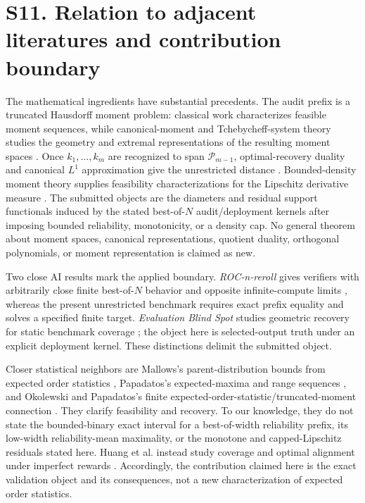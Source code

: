 \documentclass[10pt,twocolumn]{article}
\begin{document}
\section*{S11. Relation to adjacent literatures and contribution boundary}

The mathematical ingredients have substantial precedents. The audit prefix is
a truncated Hausdorff moment problem: classical work characterizes feasible
moment sequences, while canonical-moment and Tchebycheff-system theory studies
the geometry and extremal representations of the resulting moment spaces
\citep{hausdorff1921,dette1997}. Once $k_1,\ldots,k_m$ are recognized to span
$\mathcal P_{m-1}$, optimal-recovery duality and canonical $L^1$
approximation give the unrestricted distance \citep{donoho1994,bojanov1986}.
Bounded-density moment theory supplies feasibility characterizations for the
Lipschitz derivative measure \citep{lasserre2006}. The submitted objects are
the diameters and residual support functionals induced by the stated
best-of-$N$ audit/deployment kernels after imposing bounded reliability,
monotonicity, or a density cap. No general theorem about moment spaces,
canonical representations, quotient duality, orthogonal polynomials, or
moment representation is claimed as new.

Two close AI results mark the applied boundary. \emph{ROC-n-reroll} gives
verifiers with arbitrarily close finite best-of-$N$ behavior and opposite
infinite-compute limits \citep{dorner2026}, whereas the present unrestricted
benchmark requires exact prefix equality and solves a specified finite target.
\emph{Evaluation Blind Spot} studies geometric recovery for static benchmark
coverage \citep{wang2026}; the object here is selected-output truth under an
explicit deployment kernel. These distinctions delimit the submitted object.

Closer statistical neighbors are Mallows's parent-distribution bounds from
expected order statistics \citep{mallows1973}, Papadatos's expected-maxima and
range sequences \citep{papadatos2017}, and Okolewski and Papadatos's finite
expected-order-statistic/truncated-moment connection \citep{okolewski2024}.
They clarify feasibility and recovery. To our knowledge, they do not state the
bounded-binary exact interval for a best-of-width reliability prefix, its
low-width reliability-mean maximality, or the monotone and capped-Lipschitz
residuals stated here. Huang et al. instead study coverage and optimal alignment
under imperfect rewards \citep{huang2025}. Accordingly, the contribution claimed
here is the exact validation object and its consequences, not a new
characterization of expected order statistics.
\end{document}
